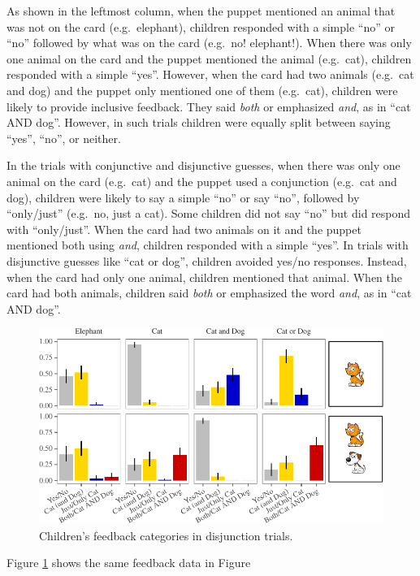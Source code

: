 \documentclass[oneside]{report}
\theoremstyle{definition}
\theoremstyle{definition}
\theoremstyle{definition}
\theoremstyle{remark}
\begin{document}
As shown in the leftmost column, when the puppet mentioned an animal
that was not on the card (e.g.~elephant), children responded with a
simple ``no'' or ``no'' followed by what was on the card (e.g.~no!
elephant!). When there was only one animal on the card and the puppet
mentioned the animal (e.g.~cat), children responded with a simple
``yes''. However, when the card had two animals (e.g.~cat and dog) and
the puppet only mentioned one of them (e.g.~cat), children were likely
to provide inclusive feedback. They said \emph{both} or emphasized
\emph{and}, as in ``cat AND dog''. However, in such trials children were
equally split between saying ``yes'', ``no'', or neither.

In the trials with conjunctive and disjunctive guesses, when there was
only one animal on the card (e.g.~cat) and the puppet used a conjunction
(e.g.~cat and dog), children were likely to say a simple ``no'' or say
``no'', followed by ``only/just'' (e.g.~no, just a cat). Some children
did not say ``no'' but did respond with ``only/just''. When the card had
two animals on it and the puppet mentioned both using \emph{and},
children responded with a simple ``yes''. In trials with disjunctive
guesses like ``cat or dog'', children avoided yes/no responses. Instead,
when the card had only one animal, children mentioned that animal. When
the card had both animals, children said \emph{both} or emphasized the
word \emph{and}, as in ``cat AND dog''.
\begin{figure}[t]

{\centering \includegraphics{figs/correctivePlot-1} 

}

\caption{Children's feedback categories in disjunction trials.}\label{fig:correctivePlot}
\end{figure}
Figure \ref{fig:correctivePlot} shows the same feedback data in Figure
\end{document}
